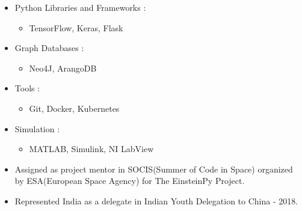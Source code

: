 \documentclass[10pt,a4paper,ragged2e]{altacv}
\begin{document}




\begin{itemize}
\item Python Libraries and Frameworks :
  \begin{itemize}
    \item TensorFlow, Keras, Flask
  \end{itemize}
\item Graph Databases :
  \begin{itemize}
    \item Neo4J, ArangoDB
  \end{itemize}
\item Tools :
  \begin{itemize}
    \item Git, Docker, Kubernetes
  \end{itemize}
\item Simulation :
  \begin{itemize}
    \item MATLAB, Simulink, NI LabView
  \end{itemize}
\end{itemize}






\begin{itemize}
\item Assigned as project mentor in SOCIS(Summer of Code in Space) organized by ESA(European Space Agency) for The EinsteinPy Project.
\end{itemize}

\divider

\begin{itemize}
\item Represented India as a delegate in Indian Youth Delegation to China - 2018.
\end{itemize}


\end{document}
